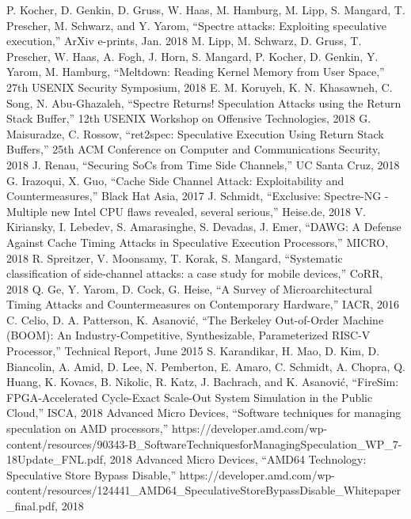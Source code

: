 \begin{thebibliography}{00}
     P. Kocher, D. Genkin, D. Gruss, W. Haas, M. Hamburg, M. Lipp, S. Mangard, T. Prescher, M. Schwarz, and Y. Yarom, ``Spectre attacks: Exploiting speculative execution,'' ArXiv e-prints, Jan. 2018
     M. Lipp, M. Schwarz, D. Gruss, T. Prescher, W. Haas, A. Fogh, J. Horn, S. Mangard, P. Kocher, D. Genkin, Y. Yarom, M. Hamburg, ``Meltdown: Reading Kernel Memory from User Space,'' 27th USENIX Security Symposium, 2018
     E. M. Koruyeh, K. N. Khasawneh, C. Song, N. Abu-Ghazaleh, ``Spectre Returns! Speculation Attacks using the Return Stack Buffer,'' 12th USENIX Workshop on Offensive Technologies, 2018
     G. Maisuradze, C. Rossow, ``ret2spec: Speculative Execution Using Return Stack Buffers,'' 25th ACM Conference on Computer and Communications Security, 2018
     J. Renau, ``Securing SoCs from Time Side Channels,'' UC Santa Cruz, 2018
     G. Irazoqui, X. Guo, ``Cache Side Channel Attack: Exploitability and Countermeasures,'' Black Hat Asia, 2017
     J. Schmidt, ``Exclusive: Spectre-NG - Multiple new Intel CPU flaws revealed, several serious,'' Heise.de, 2018
     V. Kiriansky, I. Lebedev, S. Amarasinghe, S. Devadas, J. Emer, ``DAWG: A Defense Against Cache Timing Attacks in Speculative Execution Processors,'' MICRO, 2018
     R. Spreitzer, V. Moonsamy, T. Korak, S. Mangard, ``Systematic classification of side-channel attacks: a case study for mobile devices,'' CoRR, 2018
     Q. Ge, Y. Yarom, D. Cock, G. Heise, ``A Survey of Microarchitectural Timing Attacks and Countermeasures on Contemporary Hardware,'' IACR, 2016
     C. Celio, D. A. Patterson, K. Asanović, ``The Berkeley Out-of-Order Machine (BOOM): An Industry-Competitive, Synthesizable, Parameterized RISC-V Processor,'' Technical Report, June 2015
     S. Karandikar, H. Mao, D. Kim, D. Biancolin, A. Amid, D. Lee, N. Pemberton, E. Amaro, C. Schmidt, A. Chopra, Q. Huang, K. Kovacs, B. Nikolic, R. Katz, J. Bachrach, and K. Asanović, ``FireSim: FPGA-Accelerated Cycle-Exact Scale-Out System Simulation in the Public Cloud,'' ISCA, 2018
     Advanced Micro Devices, ``Software techniques for managing speculation on AMD processors,'' https://developer.amd.com/wp-content/resources/90343-B\_SoftwareTechniquesforManagingSpeculation\_WP\_7-18Update\_FNL.pdf, 2018
     Advanced Micro Devices, ``AMD64 Technology: Speculative Store Bypass Disable,'' https://developer.amd.com/wp-content/resources/124441\_AMD64\_SpeculativeStoreBypassDisable\_Whitepaper\_final.pdf, 2018

\end{thebibliography}
